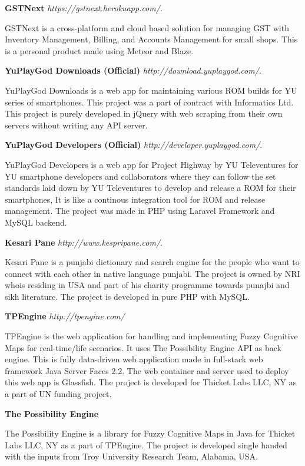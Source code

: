 \documentclass[margin,line]{res}
\begin{document}
\begin{resume}
\textbf{GSTNext} {\em https://gstnext.herokuapp.com/}.

GSTNext is a cross-platform and cloud based solution for managing GST with Inventory Management, Billing, and Accounts Management for small shops. This is a personal product made using Meteor and Blaze.

\textbf{YuPlayGod Downloads (Official)} {\em http://download.yuplaygod.com/}. 

YuPlayGod Downloads is a web app for maintaining various ROM builds for YU series of smartphones. This project was a part of contract with Informatics Ltd. This project is purely developed in jQuery with web scraping from their own servers without writing any API server.

\textbf{YuPlayGod Developers (Official)} {\em http://developer.yuplaygod.com/}.

YuPlayGod Developers is a web app for Project Highway by YU Televentures for YU smartphone developers and collaborators where they can follow the set standards laid down by YU Televentures to develop and release a ROM for their smartphones, It is like a continous integration tool for ROM and release management. The project was made in PHP using  Laravel Framework and MySQL backend.

\textbf{Kesari Pane} {\em http://www.kespripane.com/}.

Kesari Pane is a punjabi dictionary and search engine for the people who want to connect with each other in native language punjabi. The project is owned by NRI whois residing in USA and part of his charity programme towards punajbi and sikh literature. The project is developed in pure PHP with MySQL. 

\textbf{TPEngine} {\em http://tpengine.com/} 

TPEngine is the web application for handling and implementing Fuzzy Cognitive Maps for real-time/life scenarios. It uses The Possibility Engine API as back engine. This is fully data-driven web application made in full-stack web framework Java Server Faces 2.2. The web container and server used to deploy this web app is Glassfish. The project is developed for Thicket Labs LLC, NY as a part of UN funding project.

\textbf{The Possibility Engine} 

The Possibility Engine is a library for Fuzzy Cognitive Maps in Java for Thicket Labs LLC, NY as a part of TPEngine. The project is developed single handed with the inputs from Troy University Research Team, Alabama, USA.


\end{resume}
\end{document}
